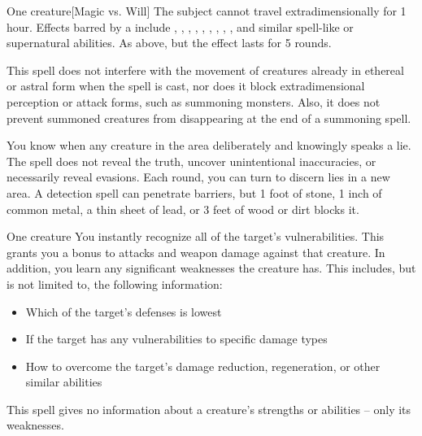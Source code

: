 \spellrng{\rngmed}
\begin{spelltarget}{One creature}[Magic vs. Will]
    \spellsuccess  The subject cannot travel extradimensionally for 1 hour. Effects barred by a  include , , , , , , , , , and similar spell-like or supernatural abilities.
    \spellfailure As above, but the effect lasts for 5 rounds.
\end{spelltarget}
\spellnotes This spell does not interfere with the movement of creatures already in ethereal or astral form when the spell is cast, nor does it block extradimensional perception or attack forms, such as summoning monsters. Also, it does not prevent summoned creatures from disappearing at the end of a summoning spell.

\spellline
\spelleffect You know when any creature in the area deliberately and knowingly speaks a lie. The spell does not reveal the truth, uncover unintentional inaccuracies, or necessarily reveal evasions.
\spellnotes Each round, you can turn to discern lies in a new area. A detection spell can penetrate barriers, but 1 foot of stone, 1 inch of common metal, a thin sheet of lead, or 3 feet of wood or dirt blocks it.

\spellrng{\rngmed}
\begin{spelltarget}{One creature}
    \spelleffect You instantly recognize all of the target's vulnerabilities. This grants you a  bonus to attacks and weapon damage against that creature. In addition, you learn any significant weaknesses the creature has. This includes, but is not limited to, the following information:
    \begin{itemize}
        \item Which of the target's defenses is lowest
        \item If the target has any vulnerabilities to specific damage types
        \item How to overcome the target's damage reduction, regeneration, or other similar abilities
    \end{itemize}
\end{spelltarget}
\spellnotes This spell gives no information about a creature's strengths or abilities -- only its weaknesses.

